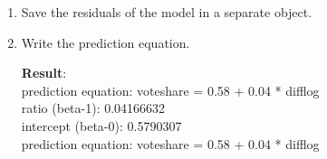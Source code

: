 \documentclass[12pt,letterpaper]{article}
\begin{document}
\begin{enumerate}
			\vspace{.25cm}
		\item Save the residuals of the model in a separate object.	
			\vspace{.25cm}
			 
			\vspace{.25cm}
		\item Write the prediction equation.
			\vspace{.25cm}
			 
			\textbf{Result}:\\
			prediction equation: voteshare = 0.58 + 0.04 * difflog\\
			ratio (beta-1): 0.04166632 \\
			intercept (beta-0): 0.5790307\\
			prediction equation: voteshare = 0.58 + 0.04 * difflog\\
			\vspace{.25cm}
	\end{enumerate}
	
\newpage
\end{document}
